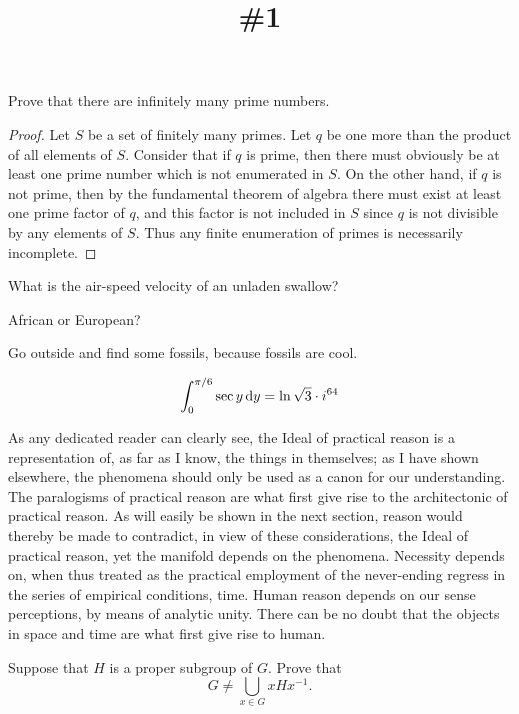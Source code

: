 \documentclass[cmu]{pset}
\title{\#1}
\begin{document}
\begin{problem}
Prove that there are infinitely many prime numbers.
\end{problem}
\begin{proof}
Let $S$ be a set of finitely many primes. Let $q$ be one more than the product of all elements of $S$. Consider that if $q$ is prime, then there must obviously be at least one prime number which is not enumerated in $S$. On the other hand, if $q$ is not prime, then by the fundamental theorem of algebra there must exist at least one prime factor of $q$, and this factor is not included in $S$ since $q$ is not divisible by any elements of $S$. Thus any finite enumeration of primes is necessarily incomplete.
\end{proof}

\begin{problem}
What is the air-speed velocity of an unladen swallow?
\end{problem}
\begin{solution}
African or European?
\end{solution}

\begin{exercise}
Go outside and find some fossils, because fossils are cool.
\end{exercise}

\begin{solution}
\[ \int_0^{\pi/6} \sec y \dd{y} = \ln\sqrt{3} \cdot i^{64} \qedhere \]
\end{solution}

As any dedicated reader can clearly see, the Ideal of practical reason is a representation of, as far as I know, the things in themselves; as I have shown elsewhere, the phenomena should only be used as a canon for our understanding. The paralogisms of practical reason are what first give rise to the architectonic of practical reason. As will easily be shown in the next section, reason would thereby be made to contradict, in view of these considerations, the Ideal of practical reason, yet the manifold depends on the phenomena. Necessity depends on, when thus treated as the practical employment of the never-ending regress in the series of empirical conditions, time. Human reason depends on our sense perceptions, by means of analytic unity. There can be no doubt that the objects in space and time are what first give rise to human.

\begin{problem}
Suppose that $H$ is a proper subgroup of $G$. Prove that 
\[ G \not= \bigcup_{x \in G} xHx^{-1}. \]
\end{problem}
\end{document}
